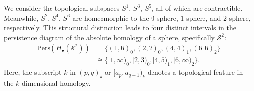 \begin{example}{\cite[\S 2.3, Example]{de2011dualities}}
    We consider the topological subspaces $S^{1}$,
    $S^{3}$, $S^{5}$, all of which are contractible. Meanwhile,
    $S^{2}$, $S^{4}$, $S^{6}$ are homeomorphic to the $0$-sphere, $1$-sphere, and $2$-sphere,
    respectively. This structural distinction leads to four distinct intervals in
    the persistence diagram of the absolute homology of a sphere, specifically $\mathcal{S}^{2}$:
    \begin{align}
        \mathrm{Pers}(H_{\bullet}(\mathcal{S}^{2})) & = \{(1,6)_{0}, (2,2)_{0}, (4,4)_{1}, (6,6)_{2} \}             \nonumber\\
                                                    & \cong \{[1,\infty)_{0}, [2,3)_{0}, [4,5)_{1}, [6, \infty)_{2} \}.
    \end{align}
    Here, the subscript $k$ in $(p,q)_{k}$ or $[a_{p}, a_{q+1})_{k}$ denotes a topological
    feature in the $k$-dimensional homology.
\end{example}


